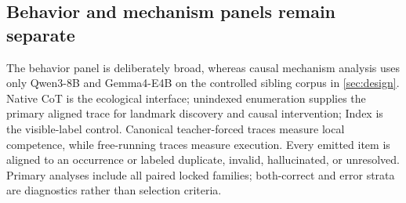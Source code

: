 \subsection{Behavior and mechanism panels remain separate}

The behavior panel is deliberately broad, whereas causal mechanism analysis
uses only Qwen3-8B and Gemma4-E4B on the controlled sibling corpus in
\cref{sec:design}. Native CoT is the ecological interface; unindexed
enumeration supplies the primary aligned trace for landmark discovery and
causal intervention; Index is the visible-label control. Canonical
teacher-forced traces measure local competence, while free-running traces
measure execution. Every emitted item is aligned to an occurrence or labeled
duplicate, invalid, hallucinated, or unresolved. Primary analyses include all
paired locked families; both-correct and error strata are diagnostics rather
than selection criteria.
